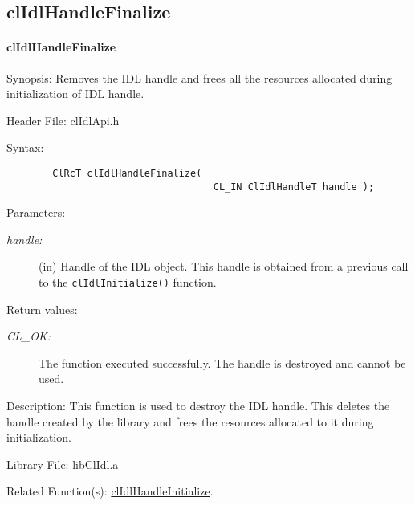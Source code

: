 \begin{flushleft}
\subsection{clIdlHandleFinalize}
\hypertarget{pageidl204}{}\paragraph{cl\-Idl\-Handle\-Finalize}\label{pageidl204}
\begin{Desc}
\item[Synopsis:]Removes the IDL handle and frees all the resources allocated during initialization of IDL handle. \end{Desc}
\begin{Desc}
\item[Header File:]clIdlApi.h\end{Desc}
\begin{Desc}
\item[Syntax:]

\footnotesize\begin{verbatim}        ClRcT clIdlHandleFinalize(
                          			CL_IN ClIdlHandleT handle );
\end{verbatim}
\normalsize
\end{Desc}
\begin{Desc}
\item[Parameters:]
\begin{description}
\item[{\em handle:}](in) Handle of the IDL object. This handle is obtained from a previous call to the {\tt{clIdlInitialize()}} function.\end{description}
\end{Desc}
\begin{Desc}
\item[Return values:]
\begin{description}
\item[{\em CL\_\-OK:}]The function executed successfully. The handle is destroyed and cannot be used.\end{description}
\end{Desc}
\begin{Desc}
\item[Description:]This function is used to destroy the IDL handle. This deletes the handle created by the library and frees the resources allocated to it
during initialization.\end{Desc}
\begin{Desc}
\item[Library File:]lib\-Cl\-Idl.a\end{Desc}
\begin{Desc}
\item[Related Function(s):]\hyperlink{pageidl201}{cl\-Idl\-Handle\-Initialize}. \end{Desc}


\end{flushleft}

